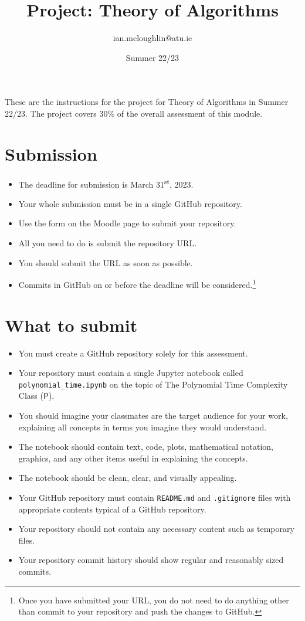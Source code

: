 \documentclass{iansnotes}
\title{Project: Theory of Algorithms}
\author{ian.mcloughlin@atu.ie}
\date{Summer 22/23}
\begin{document}
 
\maketitle

These are the instructions for the project for Theory of Algorithms in Summer 22/23.
The project covers 30\% of the overall assessment of this module.


\section{Submission}

\begin{itemize}
  \item The deadline for submission is March 31\textsuperscript{st}, 2023. 
  \item Your whole submission must be in a single GitHub repository.
  \item Use the form on the Moodle page to submit your repository.
  \item All you need to do is submit the repository URL.
  \item You should submit the URL as soon as possible.
  \item Commits in GitHub on or before the deadline will be considered.\footnote{Once you have submitted your URL, you do not need to do anything other than commit to your repository and push the changes to GitHub.}
\end{itemize}


\section{What to submit}

\begin{itemize}
  \item You must create a GitHub repository solely for this assessment.
  \item Your repository must contain a single Jupyter notebook called \texttt{polynomial\_time.ipynb} on the topic of The Polynomial Time Complexity Class ($\textsf{P}$).
  \item You should imagine your classmates are the target audience for your work, explaining all concepts in terms you imagine they would understand.
  \item The notebook should contain text, code, plots, mathematical notation, graphics, and any other items useful in explaining the concepts.
  \item The notebook should be clean, clear, and visually appealing.
  \item Your GitHub repository must contain \texttt{README.md} and \texttt{.gitignore} files with appropriate contents typical of a GitHub repository.
  \item Your repository should not contain any necessary content such as temporary files.
  \item Your repository commit history should show regular and reasonably sized commits.
\end{itemize}
\end{document}
